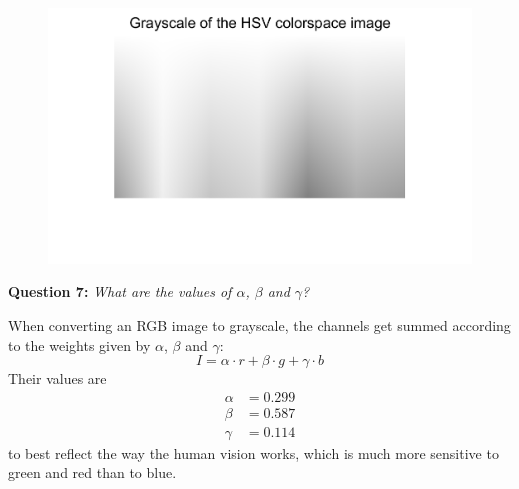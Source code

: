 \begin{figure}[H]
    \centering
    \includegraphics[width=0.5\linewidth]{Doc/Graphics/Part1/Part1_Question6b.png}
    \label{fig:enter-label}
\end{figure}



\textbf{Question 7:}
\textit{What are the values of $\alpha$, $\beta$ and $\gamma$?}

When converting an RGB image to grayscale, the channels get summed according to the weights given by $\alpha$, $\beta$ and $\gamma$:
\begin{equation}
    I = \alpha \cdot r + \beta \cdot g + \gamma \cdot b
\end{equation}
Their values are 
\begin{align*}
    \alpha &= 0.299 \\
    \beta &= 0.587 \\
    \gamma &= 0.114
\end{align*}
to best reflect the way the human vision works, which is much more sensitive to green and red than to blue.





